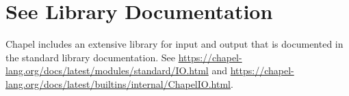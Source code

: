 \label{Input_and_Output}

\section{See Library Documentation}

Chapel includes an extensive library for input and output that is
documented in the standard library documentation. See
\url{https://chapel-lang.org/docs/latest/modules/standard/IO.html}
and
\url{https://chapel-lang.org/docs/latest/builtins/internal/ChapelIO.html}.

